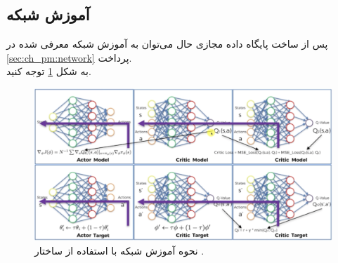 \subsection{آموزش شبکه }
پس از ساخت پایگاه داده مجازی حال می‌توان به آموزش شبکه معرفی شده در \ref{sec:ch_pm:network} پرداخت.
\\
به شکل \ref{fig:ch_er:td3} توجه کنید.

\begin{figure}[!ht]
	\centering 
	\includegraphics[width=\textwidth]{img/chaps/er/td3.png}
	\caption{نحوه آموزش شبکه با استفاده از ساختار  \cite{fujimoto2018addressing}.}    
	\label{fig:ch_er:td3}
\end{figure} 

